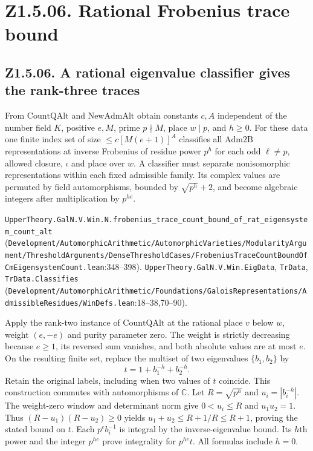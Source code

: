 \section*{Z1.5.06. Rational Frobenius trace bound}

\subsection{Z1.5.06. A rational eigenvalue classifier gives the rank-three traces}\label{r5:Z1.5.06}
From $\mathrm{CountQAlt}$ and $\mathrm{NewAdmAlt}$ obtain constants $c,A$ independent of the number field $K$, positive $e,M$, prime $p\nmid M$, place $w\mid p$, and $h\ge0$. For these data one finite index set of size $\le c[M(e+1)]^A$ classifies all $\mathrm{Adm2B}$ representations at inverse Frobenius of residue power $p^h$ for each odd $\ell\ne p$, allowed closure, $\iota$ and place over $w$. A classifier must separate nonisomorphic representations within each fixed admissible family. Its complex values are permuted by field automorphisms, bounded by $\sqrt{p^h}+2$, and become algebraic integers after multiplication by $p^{he}$.

{\footnotesize \nolinkurl{UpperTheory.GalN.V.Win.N.frobenius_trace_count_bound_of_rat_eigensystem_count_alt} (\nolinkurl{Development/AutomorphicArithmetic/AutomorphicVarieties/ModularityArgument/ThresholdArguments/DenseThresholdCases/FrobeniusTraceCountBoundOfCmEigensystemCount.lean}\allowbreak:348--398). \nolinkurl{UpperTheory.GalN.V.Win.EigData}, \nolinkurl{TrData}, \nolinkurl{TrData.Classifies} (\nolinkurl{Development/AutomorphicArithmetic/Foundations/GaloisRepresentations/AdmissibleResidues/WinDefs.lean}\allowbreak:18--38,70--90).}

Apply the rank-two instance of $\mathrm{CountQAlt}$ at the rational place $v$ below $w$, weight $(e,-e)$ and purity parameter zero. The weight is strictly decreasing because $e\ge1$, its reversed sum vanishes, and both absolute values are at most $e$. On the resulting finite set, replace the multiset of two eigenvalues $\{b_1,b_2\}$ by
\[
 t=1+b_1^{-h}+b_2^{-h}.
\]
Retain the original labels, including when two values of $t$ coincide. This construction commutes with automorphisms of $\mathbb C$. Let $R=\sqrt{p^h}$ and $u_i=|b_i^{-h}|$. The weight-zero window and determinant norm give $0<u_i\le R$ and $u_1u_2=1$. Thus $(R-u_1)(R-u_2)\ge0$ yields $u_1+u_2\le R+1/R\le R+1$, proving the stated bound on $t$. Each $p^e b_i^{-1}$ is integral by the inverse-eigenvalue bound. Its $h$th power and the integer $p^{he}$ prove integrality for $p^{he}t$. All formulas include $h=0$.

